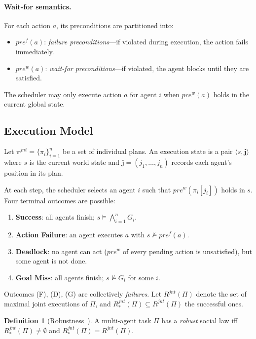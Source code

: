 \documentclass{article}
\theoremstyle{definition}
\newtheorem{definition}{Definition}
\newcommand{\pref}{\mathit{pre}^f}
\newcommand{\prew}{\mathit{pre}^w}
\begin{document}
\paragraph{Wait-for semantics.}
For each action $a$, its preconditions are partitioned into:
\begin{itemize}
  \item $\pref(a)$: \emph{failure preconditions}---if violated during execution, the action fails immediately.
  \item $\prew(a)$: \emph{wait-for preconditions}---if violated, the agent blocks until they are satisfied.
\end{itemize}
The scheduler may only execute action $a$ for agent $i$ when $\prew(a)$ holds in the current global state.

\subsection{Execution Model}

Let $\pi^{jnt} = \{\pi_i\}_{i=1}^n$ be a set of individual plans. An execution state is a pair $\langle s, \mathbf{j} \rangle$ where $s$ is the current world state and $\mathbf{j} = (j_1, \ldots, j_n)$ records each agent's position in its plan.

At each step, the scheduler selects an agent $i$ such that $\prew(\pi_i[j_i])$ holds in $s$. Four terminal outcomes are possible:

\begin{enumerate}
  \item[\textbf{(S)}] \textbf{Success}: all agents finish; $s \models \bigwedge_{i=1}^n G_i$.
  \item[\textbf{(F)}] \textbf{Action Failure}: an agent executes $a$ with $s \not\models \pref(a)$.
  \item[\textbf{(D)}] \textbf{Deadlock}: no agent can act ($\prew$ of every pending action is unsatisfied), but some agent is not done.
  \item[\textbf{(G)}] \textbf{Goal Miss}: all agents finish; $s \not\models G_i$ for some $i$.
\end{enumerate}

Outcomes (F), (D), (G) are collectively \emph{failures}. Let $R^{jnt}(\Pi)$ denote the set of maximal joint executions of $\Pi$, and $R^{jnt}_*(\Pi) \subseteq R^{jnt}(\Pi)$ the successful ones.

\begin{definition}[Robustness~\cite{nir2023}]
A multi-agent task $\Pi$ has a \emph{robust} social law iff $R^{jnt}_*(\Pi) \neq \emptyset$ and $R^{jnt}_*(\Pi) = R^{jnt}(\Pi)$.
\end{definition}
\end{document}
